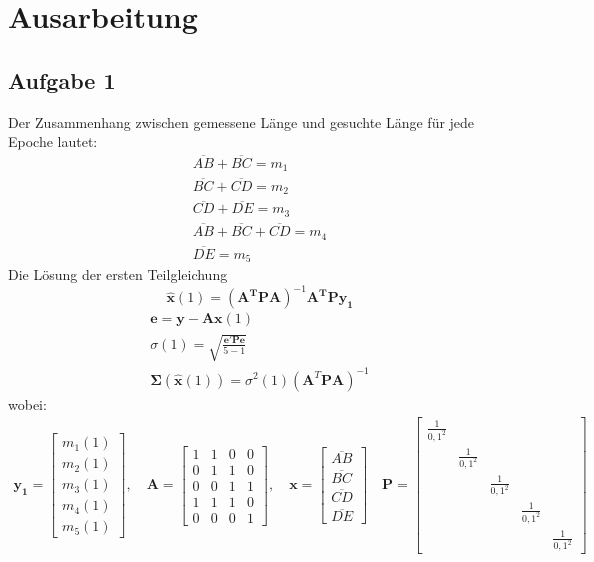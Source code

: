 \chapter{Ausarbeitung}
\section{Aufgabe 1}
Der Zusammenhang zwischen gemessene Länge und gesuchte Länge für jede Epoche lautet:
\begin{gather}
	\overline{AB} + \overline{BC} = m_1 \\
	\overline{BC} + \overline{CD} = m_2 \\
	\overline{CD} + \overline{DE} = m_3 \\
	\overline{AB} + \overline{BC} + \overline{CD} = m_4 \\
	\overline{DE} = m_5
\end{gather}
Die Lösung der ersten Teilgleichung
\begin{equation}
	\bm{\hat{x}}(1) = (\bm{A^T} \bm{P} \bm{A})^{-1}  \bm{A^T}  \bm{P}  \bm{y_1} 
\end{equation}
\begin{gather}
\bm{e} = \bm{y} - \bm{A}\bm{x}(1) \\
\sigma(1) = \sqrt{\frac{\bm{e}' \bm{P} \bm{e}}{5-1}} \\
\bm{\Sigma}(\bm{\hat{x}}(1)) = \sigma^2(1)(\bm{A}^T \bm{P} \bm{A})^{-1}
\end{gather}
wobei:
\begin{gather}
\bm{y_1} = \begin{bmatrix}
m_1(1) \\
m_2(1) \\
m_3(1) \\
m_4(1) \\
m_5(1)
\end{bmatrix}, \quad 
\bm{A} =  \begin{bmatrix}
1 & 1 & 0 & 0\\
0 & 1 & 1 & 0\\
0 & 0 & 1 & 1\\
1 & 1 & 1 & 0\\
0 & 0 & 0 & 1 
\end{bmatrix}, \quad \bm{x} = \begin{bmatrix}
\overline{AB} \\
\overline{BC} \\
\overline{CD} \\
\overline{DE} 
\end{bmatrix} \quad \bm{P} = \begin{bmatrix}
\frac{1}{0,1^2} &  &  &  &  \\
 & \frac{1}{0,1^2} &  &  &  \\
 &  & \frac{1}{0,1^2} &  &  \\
 &  &  & \frac{1}{0,1^2} &  \\
 &  &  &  & \frac{1}{0,1^2}   
\end{bmatrix}
\end{gather}
